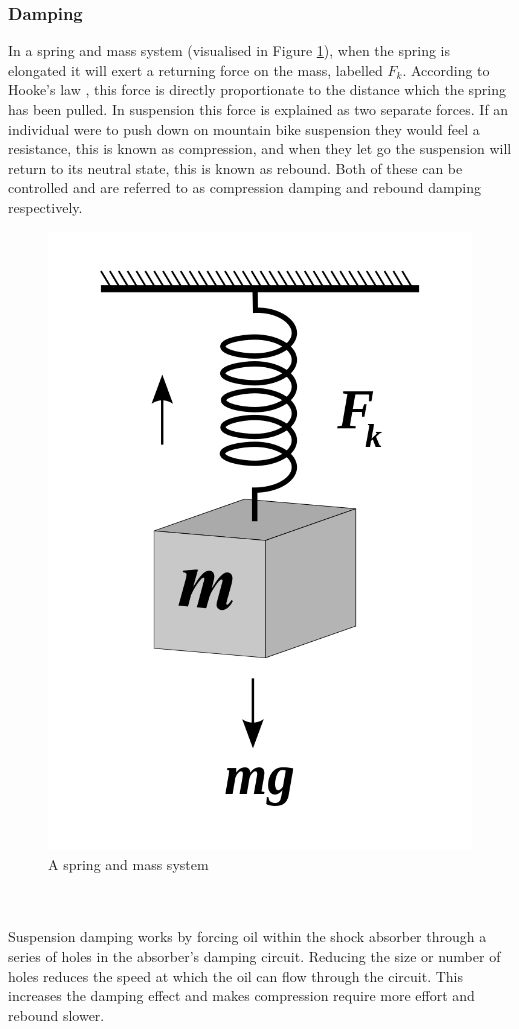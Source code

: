 	\subsubsection{Damping}
		In a spring and mass system (visualised in Figure \ref{fig:spring_and_mass}), when the spring is elongated it will exert a returning force on the mass, labelled $F_k$. According to Hooke's law \citep{rychlewski1984hooke}, this force is directly proportionate to the distance which the spring has been pulled. In suspension this force is explained as two separate forces. If an individual were to push down on mountain bike suspension they would feel a resistance, this is known as compression, and when they let go the suspension will return to its neutral state, this is known as rebound. Both of these can be controlled and are referred to as compression damping and rebound damping respectively.
		\begin{figure}[h!]
			\centering
			\includegraphics[scale=0.2]{../images/spring_and_mass.png}
			\caption{A spring and mass system}
			\label{fig:spring_and_mass}
		\end{figure}
		\\\\
		Suspension damping works by forcing oil within the shock absorber through a series of holes in the absorber’s damping circuit. Reducing the size or number	of holes reduces the speed at which the oil can flow through the circuit. This increases the damping effect and makes compression require more effort and rebound slower.

